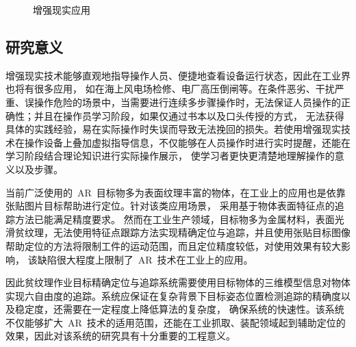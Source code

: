 \begin{figure} %
  \centering%
   \hspace{1em}
  \vskip0.3cm%
  \caption{增强现实应用}
  \label{fig:model_based_tracking_example}
\end{figure}


\subsection{研究意义}
\label{sec:significance}
增强现实技术能够直观地指导操作人员、便捷地查看设备运行状态，因此在工业界也将有很多应用，
如在海上风电场检修、电厂高压倒闸等。在条件恶劣、干扰严重、误操作危险的场景中，当需要进行连续多步骤操作时，无法保证人员操作的正确性；并且在操作员学习阶段，如果仅通过书本以及口头传授的方式，
无法获得具体的实践经验，易在实际操作时失误而导致无法挽回的损失。若使用增强现实技术在操作设备上叠加虚拟指导信息，不仅能够在人员操作时进行实时提醒，还能在学习阶段结合理论知识进行实际操作展示，
使学习者更快更清楚地理解操作的意义以及步骤\cite{CaiZengQiangXianShiARZaiJiaoXueZhongDeYingYongAnLiPingShu2017}。

当前广泛使用的~AR~目标物多为表面纹理丰富的物体，在工业上的应用也是依靠张贴图片目标帮助进行定位。针对该类应用场景，
采用基于物体表面特征点的追踪方法已能满足精度要求\cite{AhmedImprovedPerturbObserve2015}。
然而在工业生产领域，目标物多为金属材料，表面光滑贫纹理，无法使用特征点跟踪方法实现精确定位与追踪，并且使用张贴目标图像帮助定位的方法将限制工件的运动范围，而且定位精度较低，对使用效果有较大影响，
该缺陷很大程度上限制了~AR~技术在工业上的应用\cite{RanXuNiXianShiJiZengQiangXianShiJiZhuZaiGongYeSheJiZhongDeYingYong2010,LiuARJiZhuZaiQiCheGongYeLingYuDeYingYong2017}。

因此贫纹理作业目标精确定位与追踪系统需要使用目标物体的三维模型信息对物体实现六自由度的追踪。系统应保证在复杂背景下目标姿态位置检测追踪的精确度以及稳定度，还需要在一定程度上降低算法的复杂度，
确保系统的快速性。该系统不仅能够扩大~AR~技术的适用范围，还能在工业抓取、装配领域起到辅助定位的效果，因此对该系统的研究具有十分重要的工程意义。




